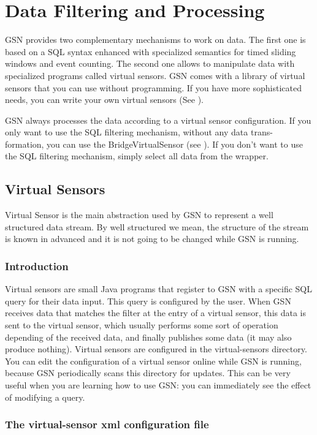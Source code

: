 \section{Data Filtering and Processing}

GSN provides two complementary mechanisms to work on data.
The first one is based on a SQL syntax enhanced with specialized semantics
for timed sliding windows and event counting.
The second one allows to manipulate data with specialized programs called
virtual sensors. GSN comes with a library of virtual sensors that you can use
without programming. If you have more sophisticated needs, you can write your
own virtual sensors (See ).

GSN always processes the data according to a virtual sensor configuration.
If you only want to use the SQL filtering mechanism, without any data trans-
formation, you can use the BridgeVirtualSensor (see ).
If you don't want to use the SQL filtering mechanism, simply select all data
from the wrapper.

\subsection{Virtual Sensors}

Virtual Sensor is the main abstraction used by GSN to represent a well structured data stream.
By well structured we mean, the structure of the stream is known in advanced and it is not going to be changed
while GSN is running.
\subsubsection{Introduction}
Virtual sensors are small Java programs that register to GSN with a specific
SQL query for their data input. This query is configured by the user. When
GSN receives data that matches the filter at the entry of a virtual sensor, this
data is sent to the virtual sensor, which usually performs some sort of operation
depending of the received data, and finally publishes some data (it may also
produce nothing).
Virtual sensors are configured in the virtual-sensors directory. You can edit
the configuration of a virtual sensor online while GSN is running, because GSN
periodically scans this directory for updates. This can be very useful when you
are learning how to use GSN: you can immediately see the effect of modifying
a query.

\subsubsection{The virtual-sensor xml configuration file}

